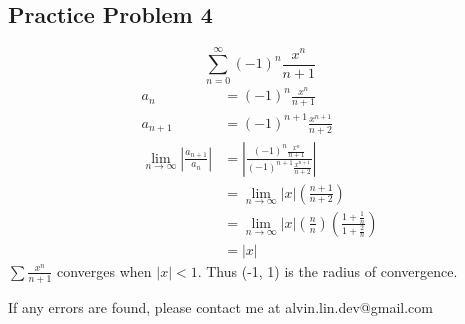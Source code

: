 \documentclass[letterpaper, 12pt]{math}
\begin{document}
\subsection*{Practice Problem 4}
\[ \sum_{n=0}^{\infty}(-1)^{n}\frac{x^{n}}{n+1} \]
\begin{align*}
  a_{n} &= (-1)^{n}\frac{x^{n}}{n+1} \\
  a_{n+1} &= (-1)^{n+1}\frac{x^{n+1}}{n+2} \\
  \lim_{n\to\infty}|\frac{a_{n+1}}{a_{n}}| &=
    |\frac{(-1)^{n}\frac{x^{n}}{n+1}}{(-1)^{n+1}\frac{x^{n+1}}{n+2}}| \\
  &= \lim_{n\to\infty}|x|(\frac{n+1}{n+2}) \\
  &= \lim_{n\to\infty}|x|(\frac{n}{n})(\frac{1+\frac{1}{n}}{1+\frac{2}{n}}) \\
  &= |x|
\end{align*}
\( \sum\frac{x^{n}}{n+1} \) converges when \( |x| < 1 \). Thus (-1, 1)
is the radius of convergence.

\begin{center}
  If any errors are found, please contact me at alvin.lin.dev@gmail.com
\end{center}
\end{document}

